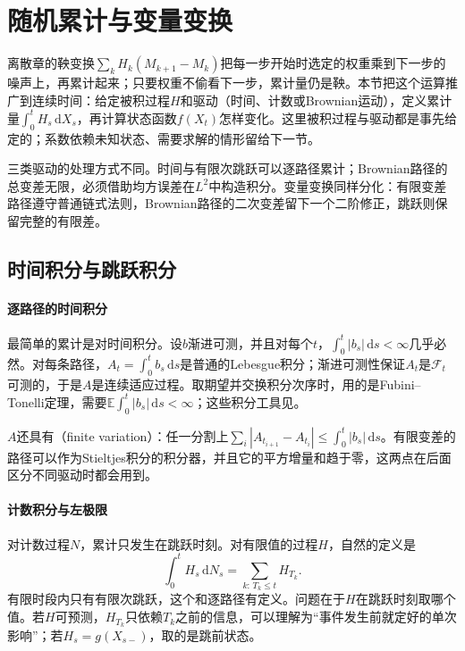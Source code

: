 \section{随机累计与变量变换}
\label{sec:ctsp-stochastic-integration}

离散章的鞅变换$\sum_kH_k(M_{k+1}-M_k)$把每一步开始时选定的权重乘到下一步的噪声上，再累计起来；只要权重不偷看下一步，累计量仍是鞅。本节把这个运算推广到连续时间：给定被积过程$H$和驱动（时间、计数或Brownian运动），定义累计量$\int_0^tH_s\,\mathrm dX_s$，再计算状态函数$f(X_t)$怎样变化。这里被积过程与驱动都是事先给定的；系数依赖未知状态、需要求解的情形留给下一节。

三类驱动的处理方式不同。时间与有限次跳跃可以逐路径累计；Brownian路径的总变差无限，必须借助均方误差在$L^2$中构造积分。变量变换同样分化：有限变差路径遵守普通链式法则，Brownian路径的二次变差留下一个二阶修正，跳跃则保留完整的有限差。

\subsection{时间积分与跳跃积分}
\label{sec:ctsp-time-jump-integrals}

\paragraph{逐路径的时间积分}
最简单的累计是对时间积分。设$b$渐进可测，并且对每个$t$，$\int_0^t|b_s|\,\mathrm ds<\infty$几乎必然。对每条路径，$A_t=\int_0^tb_s\,\mathrm ds$是普通的Lebesgue积分；渐进可测性保证$A_t$是$\mathcal F_t$可测的，于是$A$是连续适应过程。取期望并交换积分次序时，用的是Fubini--Tonelli定理，需要$\mathbb E\int_0^t|b_s|\,\mathrm ds<\infty$；这些积分工具见。

$A$还具有（finite variation）：任一分割上$\sum_i|A_{t_{i+1}}-A_{t_i}|\leq\int_0^t|b_s|\,\mathrm ds$。有限变差的路径可以作为Stieltjes积分的积分器，并且它的平方增量和趋于零，这两点在后面区分不同驱动时都会用到。

\paragraph{计数积分与左极限}
对计数过程$N$，累计只发生在跳跃时刻。对有限值的过程$H$，自然的定义是
\begin{equation}
  \int_0^tH_s\,\mathrm dN_s=\sum_{k:\,T_k\leq t}H_{T_k}.
  \label{eq:ctsp-counting-integral}
\end{equation}
有限时段内只有有限次跳跃，这个和逐路径有定义。问题在于$H$在跳跃时刻取哪个值。若$H$可预测，$H_{T_k}$只依赖$T_k$之前的信息，可以理解为“事件发生前就定好的单次影响”；若$H_s=g(X_{s-})$，取的是跳前状态。

